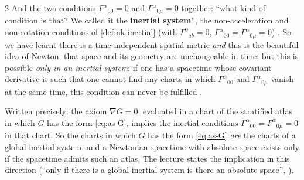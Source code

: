 \begin{paracol}{2}
And the two conditions $\Gamma^\alpha{}_{00}=0$ and $\Gamma^\alpha{}_{0\mu}=0$ together: ``what kind of condition is that? We called it the \textbf{inertial system}'', the non-acceleration and non-rotation conditions of \cref{def:nk-inertial} (with $\Gamma^0{}_{ab}=0$, $\Gamma^\alpha{}_{00}=\Gamma^\alpha{}_{0\mu}=0$)
. So we have learnt there is a time-independent spatial metric \emph{and} this is the beautiful idea of Newton, that space and its geometry are unchangeable in time; but this is possible \emph{only in an inertial system}: if one has a spacetime whose covariant derivative is such that one cannot find any charts in which $\Gamma^\alpha{}_{00}$ and $\Gamma^\alpha{}_{0\mu}$
vanish at the same time, this condition can never be fulfilled .
\begin{coursenote}
Written precisely: the axiom $\nabla G=0$, evaluated in a chart of the stratified atlas in which $G$ has the form \eqref{eq:as-G}, implies the inertial conditions $\Gamma^\alpha{}_{00}=\Gamma^\alpha{}_{0\mu}=0$ in that chart. So the charts in which $G$ has the form \eqref{eq:as-G}
\emph{are} the charts of a global inertial system, and a Newtonian spacetime with absolute space exists only if the spacetime admits such an atlas. The lecture states the implication in this direction (``only if there is a global inertial system is there an absolute space'', ).
\end{coursenote}


\end{paracol}
